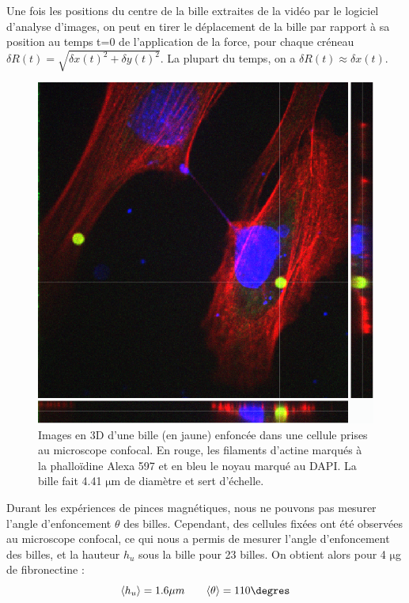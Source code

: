 \documentclass{report}
\newcommand{\micro}{$\mathrm{\mu}$}
\begin{document}
Une fois les positions du centre de la bille extraites de la vidéo par le logiciel d'analyse d'images, on peut en tirer le déplacement de la bille par rapport à sa position au temps t=0 de l'application de la force, pour chaque créneau $\delta R(t)=\sqrt{\delta x(t)^2+\delta y(t)^2}$. 
La plupart du temps, on a $\delta R(t) \approx \delta x(t)$. 

\begin{figure}
\includegraphics[scale=0.3]{confocal.png}
\caption{\label{confocal} Images en 3D d'une bille (en jaune) enfoncée dans une cellule prises au microscope confocal. En rouge, les filaments d'actine marqués à la phalloïdine Alexa 597 et en bleu le noyau marqué au DAPI. La bille fait 4.41 \micro m de diamètre et sert d'échelle.}
\end{figure}
Durant les expériences de pinces magnétiques, nous ne pouvons pas mesurer l'angle d'enfoncement $\theta$ des billes. Cependant, des cellules fixées ont été observées au microscope confocal, ce qui nous a permis de mesurer l'angle d'enfoncement des billes, et la hauteur $h_u$ sous la bille pour 23 billes. On obtient alors pour 4 \micro g de fibronectine : 
$$ \langle h_u \rangle = 1.6 \mu m \qquad \langle \theta \rangle = 110 \degres$$
\end{document}
